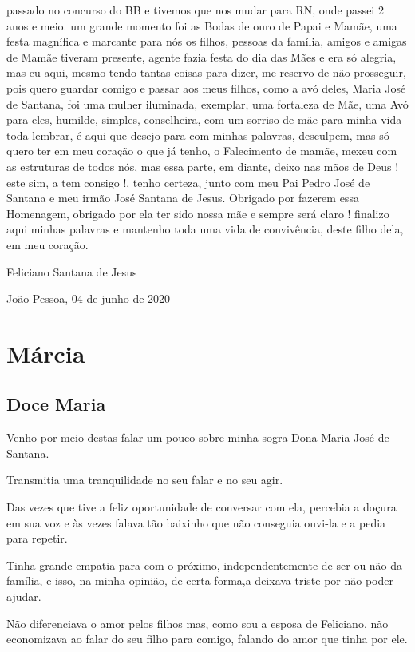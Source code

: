 \documentclass[
  brazil,
  a6paper,
  oneside,
  landscape,
  14pt]{scrbook}
\begin{document}
passado no concurso do BB e tivemos que nos mudar para RN, onde passei 2
anos e meio. um grande momento foi as Bodas de ouro de Papai e Mamãe,
uma festa magnífica e marcante para nós os filhos, pessoas da família,
amigos e amigas de Mamãe tiveram presente, agente fazia festa do dia das
Mães e era só alegria, mas eu aqui, mesmo tendo tantas coisas para
dizer, me reservo de não prosseguir, pois quero guardar comigo e passar
aos meus filhos, como a avó deles, Maria José de Santana, foi uma mulher
iluminada, exemplar, uma fortaleza de Mãe, uma Avó para eles, humilde,
simples, conselheira, com um sorriso de mãe para minha vida toda
lembrar, é aqui que desejo para com minhas palavras, desculpem, mas só
quero ter em meu coração o que já tenho, o Falecimento de mamãe, mexeu
com as estruturas de todos nós, mas essa parte, em diante, deixo nas
mãos de Deus ! este sim, a tem consigo !, tenho certeza, junto com meu
Pai Pedro José de Santana e meu irmão José Santana de Jesus. Obrigado
por fazerem essa Homenagem, obrigado por ela ter sido nossa mãe e sempre
será claro ! finalizo aqui minhas palavras e mantenho toda uma vida de
convivência, deste filho dela, em meu coração.

Feliciano Santana de Jesus

João Pessoa, 04 de junho de 2020

\hypertarget{muxe1rcia}{%
\section{Márcia}\label{muxe1rcia}}

\hypertarget{doce-maria}{%
\subsection{Doce Maria}\label{doce-maria}}

Venho por meio destas falar um pouco sobre minha sogra Dona Maria José
de Santana.

Transmitia uma tranquilidade no seu falar e no seu agir.

Das vezes que tive a feliz oportunidade de conversar com ela, percebia a
doçura em sua voz e às vezes falava tão baixinho que não conseguia
ouvi-la e a pedia para repetir.

Tinha grande empatia para com o próximo, independentemente de ser ou não
da família, e isso, na minha opinião, de certa forma,a deixava triste
por não poder ajudar.

Não diferenciava o amor pelos filhos mas, como sou a esposa de
Feliciano, não economizava ao falar do seu filho para comigo, falando do
amor que tinha por ele.
\end{document}

